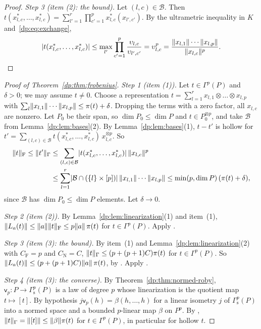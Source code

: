 \begin{proof}
\emph{Step 3 (item (2): the bound).} Let $(l,c)\in\mathcal B$. Then $t(x_{l,c}^*,\dots,x_{l,c}^*)=\sum_{l'=1}^r\prod_{c'=1}^px_{l,c}^*(x_{l',c'})$. By the ultrametric inequality in $K$ and~\eqref{dp:eq:exchange},
\[
 \lvert t(x_{l,c}^*,\dots,x_{l,c}^*)\rvert\le\max_{l'}\prod_{c'=1}^p\frac{\upsilon_{l,c}}{\upsilon_{l',c'}}=\upsilon_{l,c}^p
 =\frac{\lVert x_{l,1}\rVert\cdots\lVert x_{l,p}\rVert}{\lVert x_{l,c}\rVert^p}.\qedhere
\]
\end{proof}

\begin{proof}[Proof of Theorem~\ref{dp:thm:frobenius}]
\emph{Step 1 (item (1)).} Let $t\in\Gamma^p(P)$ and $\delta>0$; we may assume $t\ne0$. Choose a representation $t=\sum_{l=1}^rx_{l,1}\otimes\dots\otimes x_{l,p}$ with $\sum_l\lVert x_{l,1}\rVert\cdots\lVert x_{l,p}\rVert\le\pi(t)+\delta$. Dropping the terms with a zero factor, all $x_{l,c}$ are nonzero. Let $P_0$ be their span, so $\dim P_0\le\dim P$ and $t\in P_0^{\otimes p}$, and take $\mathcal B$ from Lemma~\ref{dp:lem:bases}(2). By Lemma~\ref{dp:lem:bases}(1), $t-t'$ is hollow for $t'=\sum_{(l,c)\in\mathcal B}t(x_{l,c}^*,\dots,x_{l,c}^*)\,x_{l,c}^{\otimes p}$. So
\begin{align*}
 \lVert t\rVert_{\mathrm F}\le\lVert t'\rVert_\Gamma
 &\le\sum_{(l,c)\in\mathcal B}\lvert t(x_{l,c}^*,\dots,x_{l,c}^*)\rvert\,\lVert x_{l,c}\rVert^p\\
 &\le\sum_{l=1}^r\lvert \mathcal B\cap(\{l\}\times[p])\rvert\,\lVert x_{l,1}\rVert\cdots\lVert x_{l,p}\rVert
 \le\min(p,\dim P)\,(\pi(t)+\delta),
\end{align*}
since $\mathcal B$ has $\dim P_0\le\dim P$ elements. Let $\delta\to0$.

\emph{Step 2 (item (2)).} By Lemma~\ref{dp:lem:linearization}(1) and item~(1), $\lVert L_a(t)\rVert\le\lVert a\rVert\lVert t\rVert_{\mathrm F}\le p\lVert a\rVert\,\pi(t)$ for $t\in\Gamma^p(P)$. Apply \cite[Lemma~Q.1(4)]{I}.

\emph{Step 3 (item (3): the bound).} By item~(1) and Lemma~\ref{dp:lem:linearization}(2) with $C_{\mathrm F}=p$ and $C_{\mathrm N}=C$, $\lVert t\rVert_\Gamma\le(p+(p+1)C)\pi(t)$ for $t\in\Gamma^p(P)$. So $\lVert L_a(t)\rVert\le(p+(p+1)C)\lVert a\rVert\,\pi(t)$, by \cite[Lemma~Q.1(1)]{I}. Apply \cite[Lemma~Q.1(4)]{I}.

\emph{Step 4 (item (3): the converse).} By Theorem~\ref{dp:thm:normed-roby}, $\mathsf v_p\colon P\to\Gamma^p_{\mathrm s}(P)$ is a law of degree $p$ whose linearization is the quotient map $t\mapsto[t]$. By hypothesis $j\mathsf v_p(h)=\beta(h,\dots,h)$ for a linear isometry $j$ of $\Gamma^p_{\mathrm s}(P)$ into a normed space and a bounded $p$\nobreakdash-linear map $\beta$ on $P^p$. By \cite[Lemma~Q.1(3)]{I}, $\lVert t\rVert_\Gamma=\lVert [t]\rVert\le\lVert \beta\rVert\pi(t)$ for $t\in\Gamma^p(P)$, in particular for hollow $t$.
\end{proof}

